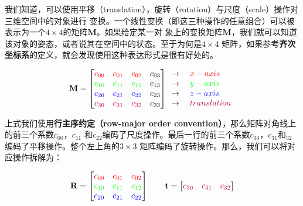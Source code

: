 \documentclass[12pt]{article}
\begin{document}
\indent{}我们知道，可以使用平移（translation），旋转（rotation）与尺度（scale）操作对三维空间中的对象进行
变换。一个线性变换（即这三种操作的任意组合）可以被表示为一个$4\times 4$的矩阵$\mathbf{M}$。如果给定某一对
象上的变换矩阵$\mathbf{M}$，我们就可以知道该对象的姿态，或者说其在空间中的状态。至于为何是$4\times 4$
矩阵，如果参考\textbf{齐次坐标系}的定义，就会发现使用这种表达形式是很有好处的。

\begin{displaymath}
\mathbf{M} = \begin{bmatrix}
\color{red}{c_{00}}& \color{red}{c_{01}}&\color{red}{c_{02}}&\color{black}{c_{03}}\\
\color{green}{c_{10}}& \color{green}{c_{11}}&\color{green}{c_{12}}&\color{black}{c_{13}}\\
\color{blue}{c_{20}}& \color{blue}{c_{21}}&\color{blue}{c_{22}}&\color{black}{c_{23}}\\
\color{purple}{c_{30}}& \color{purple}{c_{31}}&\color{purple}{c_{32}}&\color{black}{c_{33}}\\
\end{bmatrix}
\begin{array}{l}
\rightarrow \quad \color{red} {x-axis}\\
\rightarrow \quad \color{green} {y-axis}\\
\rightarrow \quad \color{blue} {z-axis}\\
\rightarrow \quad \color{purple} {translation}\\
\end{array}
\end{displaymath}

\indent{}上式我们使用\textbf{行主序约定（row-major order convention）}，那么矩阵对角线上的前三个系数$c_{00}$，$c_{11}$
和$c_{22}$编码了尺度操作。最后一行的前三个系数$c_{30}$，$c_{31}$和$_{32}$编码了平移操作。整个左上角的$3\times 3$
矩阵编码了旋转操作。那么，我们可以将对应操作拆解为：

\begin{displaymath}
\mathbf{R} =
\begin{bmatrix}
\color{red}{c_{00}}& \color{red}{c_{01}}&\color{red}{c_{02}}\\
\color{green}{c_{10}}& \color{green}{c_{11}}&\color{green}{c_{12}}\\
\color{blue}{c_{20}}& \color{blue}{c_{21}}&\color{blue}{c_{22}}\\
\end{bmatrix} \quad\quad
\mathbf{t} = \begin{bmatrix}
\color{purple}{c_{30}}& \color{purple}{c_{31}}&\color{purple}{c_{32}}
\end{bmatrix}
\end{displaymath}
\end{document}
